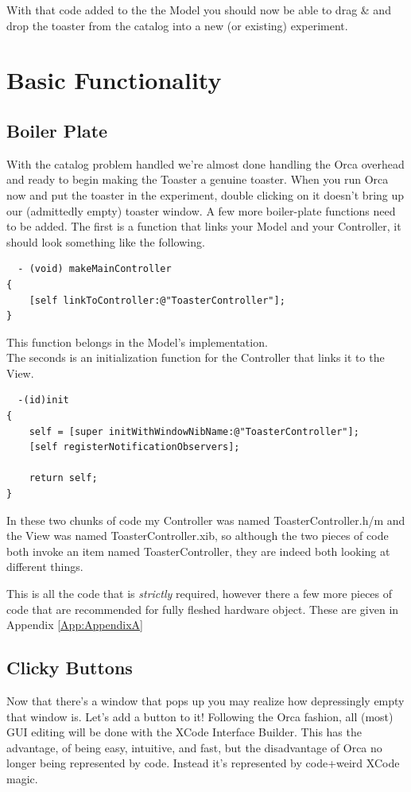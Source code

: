 \documentclass[12pt,a4paper]{article}
\begin{document}
With that code added to the the Model you should now be able to drag \& and drop the toaster from the catalog into a new (or existing) experiment.

\section{Basic Functionality}
\subsection{Boiler Plate}
With the catalog problem handled we're almost done handling the Orca overhead and ready to begin making the Toaster a genuine toaster.
 When you run Orca now and put the toaster in the experiment, double clicking on it doesn't bring up our (admittedly empty) toaster window.
  A few more boiler-plate functions need to be added.
  The first is a function that links your Model and your Controller, it should look something like the following.
  \begin{lstlisting}
  - (void) makeMainController
{
    [self linkToController:@"ToasterController"];
}
  \end{lstlisting}
  This function belongs in the Model's implementation.
  \\The seconds is an initialization function for the Controller that links it to the View.
\begin{lstlisting} 
  -(id)init
{
    self = [super initWithWindowNibName:@"ToasterController"];    
    [self registerNotificationObservers];

    return self;
}
\end{lstlisting}
In these two chunks of code my Controller was named ToasterController.h/m and the View was named ToasterController.xib, so although the two pieces of code both invoke an item named ToasterController, they are indeed both looking at different things.

This is all the code that is \emph{strictly} required, however there a few more pieces of code that are recommended for fully fleshed hardware object.
 These are given in Appendix \ref{App:AppendixA}
 \subsection{Clicky Buttons}
 Now that there's a window that pops up you may realize how depressingly empty that window is. 
 Let's add a button to it!
 Following the Orca fashion, all (most) GUI editing will be done with the XCode Interface Builder. This has the advantage, of being easy, intuitive, and fast,
 but the disadvantage of Orca no longer being represented by code.
 Instead it's represented by code+weird XCode magic.
 
\end{document}
